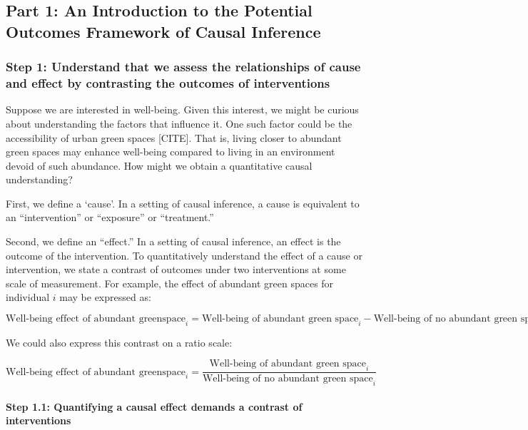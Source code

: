 \documentclass[
  singlecolumn]{article}
\let\oldparagraph\paragraph
\renewcommand{\paragraph}[1]{\oldparagraph{#1}\mbox{}}
\begin{document}
\subsection{Part 1: An Introduction to the Potential Outcomes Framework
of Causal
Inference}\label{part-1-an-introduction-to-the-potential-outcomes-framework-of-causal-inference}

\subsubsection{Step 1: Understand that we assess the relationships of
cause and effect by contrasting the outcomes of
interventions}\label{step-1-understand-that-we-assess-the-relationships-of-cause-and-effect-by-contrasting-the-outcomes-of-interventions}

Suppose we are interested in well-being. Given this interest, we might
be curious about understanding the factors that influence it. One such
factor could be the accessibility of urban green spaces {[}CITE{]}. That
is, living closer to abundant green spaces may enhance well-being
compared to living in an environment devoid of such abundance. How might
we obtain a quantitative causal understanding?

First, we define a `cause'. In a setting of causal inference, a cause is
equivalent to an ``intervention'' or ``exposure'' or ``treatment.''

Second, we define an ``effect.'' In a setting of causal inference, an
effect is the outcome of the intervention. To quantitatively understand
the effect of a cause or intervention, we state a contrast of outcomes
under two interventions at some scale of measurement. For example, the
effect of abundant green spaces for individual \(i\) may be expressed
as:

\[
\text{Well-being effect of abundant greenspace}_{i} = \text{Well-being of abundant green space}_i - \text{Well-being of no abundant green space}_i
\]

We could also express this contrast on a ratio scale:

\[
\text{Well-being effect of abundant greenspace}_i = \frac{\text{Well-being of abundant green space}_i}{\text{Well-being of no abundant green space}_i}
\]

\paragraph{\texorpdfstring{\textbf{Step 1.1: Quantifying a causal effect
demands a contrast of
interventions}}{Step 1.1: Quantifying a causal effect demands a contrast of interventions}}\label{step-1.1-quantifying-a-causal-effect-demands-a-contrast-of-interventions}
\end{document}
